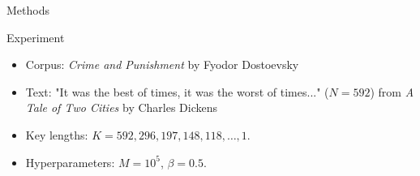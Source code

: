 \documentclass{beamer}
\begin{document}

\begin{frame}{Methods}

\begin{block}{Experiment \cite{bird2009nlp} \cite{dickens1859tale} \cite{dostoevsky1866crime}}
\begin{itemize}
\item Corpus: \textit{Crime and Punishment} by Fyodor Dostoevsky
\item Text: "It was the best of times, it was the worst of times..." ($N = 592$) from \textit{A Tale of Two Cities} by Charles Dickens
\item Key lengths: $K = 592, 296, 197, 148, 118, \ldots, 1$.
\item Hyperparameters: $M = 10^{5}$, $\beta = 0.5$.
\end{itemize}
\end{block}

\end{frame}

\end{document}
